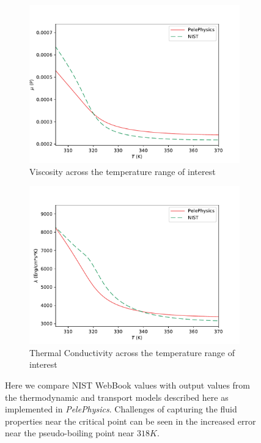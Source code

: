 \begin{figure}[H]
\begin{subfigure}{0.45\textwidth}
	\centering
	\includegraphics[scale=.45]{figures/Plots/NIST/mu_NIST_comp.pdf}
	\caption{Viscosity across the temperature range of interest} \label{mu_NIST_comp}
\end{subfigure}
\hfill
\begin{subfigure}{0.45\textwidth}
	\centering
	\includegraphics[scale=.45]{figures/Plots/NIST/lam_NIST_comp.pdf}
	\caption{Thermal Conductivity across the temperature range of interest} \label{lam_NIST_comp}
\end{subfigure}
\caption{Here we compare NIST WebBook values \cite{NIST} with output values from the thermodynamic and transport models described here as implemented in \textit{PelePhysics}. Challenges of capturing the fluid properties near the critical point can be seen in the increased error near the pseudo-boiling point near $318 K$.}
\label{NIST_quantities_compare}
\end{figure}

